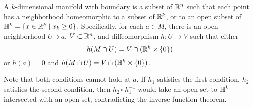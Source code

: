 \begin{definition}
    A $k$-dimensional manifold with boundary is a subset of $\mathbb R^n$ such that each point has a neighborhood homeomorphic to a subset of $\mathbb R^k$, or to an open subset of $\mathbb H^k = \{ x \in \mathbb R^k \mid x_k \geq 0 \}$. Specifically, for each $a \in M$, there is an open neighborhood $U \ni a$, $V \subset \mathbb R^n$, and diffeomorphism $h : U \to V$ such that either
    \[ h(M \cap U) = V \cap (\mathbb R^k \times \{0\}) \]
    or $h(a) = 0$ and $h(M \cap U) = V \cap (\mathbb H^k \times \{0\})$.
\end{definition}
\noindent Note that both conditions cannot hold at $a$. If $h_1$ satisfies the first condition, $h_2$ satisfies the second condition, then $h_2 \circ h_1^{-1}$ would take an open set to $\mathbb H^k$ intersected with an open set, contradicting the inverse function theorem.